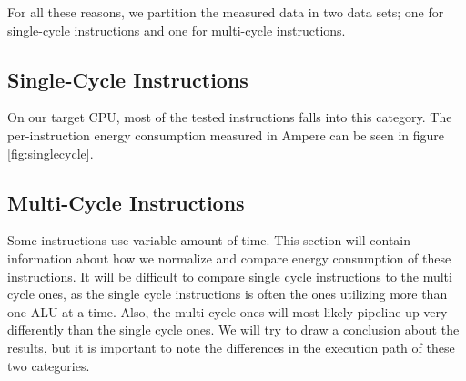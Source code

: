 For all these reasons, we partition the measured data in two data sets; one for
single-cycle instructions and one for multi-cycle instructions.

\subsection{Single-Cycle Instructions}
On our target CPU, most of  the tested instructions falls into
this category. The per-instruction energy consumption measured in Ampere can be
seen in figure \ref{fig:singlecycle}.

\subsection{Multi-Cycle Instructions}
Some instructions use variable amount of time. This section will contain
information about how we normalize and compare energy consumption of
these instructions. It will be difficult to compare single cycle instructions
to the multi cycle ones, as the single cycle instructions is often the ones
utilizing more than one ALU at a time. Also, the multi-cycle ones will most
likely pipeline up very differently than the single cycle ones. We will try to
draw a conclusion about the results, but it is important to note the differences
in the execution path of these two categories.
